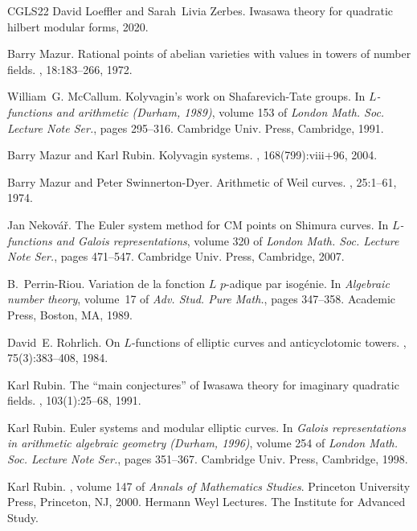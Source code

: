 \documentclass[10pt,reqno]{amsart}
\numberwithin{equation}{section}
\theoremstyle{plain}
\theoremstyle{definition}
\theoremstyle{definition}
\theoremstyle{plain}
\theoremstyle{plain}
\theoremstyle{plain}
\theoremstyle{plain}
\theoremstyle{plain}
\theoremstyle{plain}
\begin{document}
\begin{thebibliography}{CGLS22}
David Loeffler and Sarah~Livia Zerbes.
\newblock Iwasawa theory for quadratic hilbert modular forms, 2020.

Barry Mazur.
\newblock Rational points of abelian varieties with values in towers of number
  fields.
, 18:183--266, 1972.

William~G. McCallum.
\newblock Kolyvagin's work on {S}hafarevich-{T}ate groups.
\newblock In {\em {$L$}-functions and arithmetic ({D}urham, 1989)}, volume 153
  of {\em London Math. Soc. Lecture Note Ser.}, pages 295--316. Cambridge Univ.
  Press, Cambridge, 1991.

Barry Mazur and Karl Rubin.
\newblock Kolyvagin systems.
, 168(799):viii+96, 2004.

Barry Mazur and Peter Swinnerton-Dyer.
\newblock Arithmetic of {W}eil curves.
, 25:1--61, 1974.

Jan Nekov\'{a}\v{r}.
\newblock The {E}uler system method for {CM} points on {S}himura curves.
\newblock In {\em {$L$}-functions and {G}alois representations}, volume 320 of
  {\em London Math. Soc. Lecture Note Ser.}, pages 471--547. Cambridge Univ.
  Press, Cambridge, 2007.

B.~Perrin-Riou.
\newblock Variation de la fonction {$L$} {$p$}-adique par isog\'{e}nie.
\newblock In {\em Algebraic number theory}, volume~17 of {\em Adv. Stud. Pure
  Math.}, pages 347--358. Academic Press, Boston, MA, 1989.

David~E. Rohrlich.
\newblock On {$L$}-functions of elliptic curves and anticyclotomic towers.
, 75(3):383--408, 1984.

Karl Rubin.
\newblock The ``main conjectures'' of {I}wasawa theory for imaginary quadratic
  fields.
, 103(1):25--68, 1991.

Karl Rubin.
\newblock Euler systems and modular elliptic curves.
\newblock In {\em Galois representations in arithmetic algebraic geometry
  ({D}urham, 1996)}, volume 254 of {\em London Math. Soc. Lecture Note Ser.},
  pages 351--367. Cambridge Univ. Press, Cambridge, 1998.

Karl Rubin.
, volume 147 of {\em Annals of Mathematics
  Studies}.
\newblock Princeton University Press, Princeton, NJ, 2000.
\newblock Hermann Weyl Lectures. The Institute for Advanced Study.


\end{thebibliography}
\end{document}
